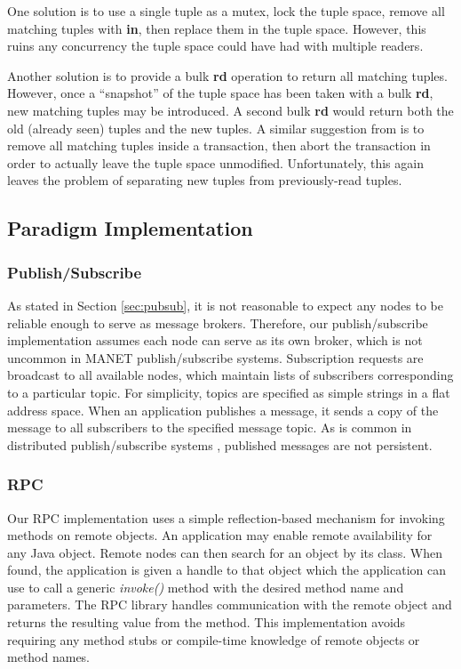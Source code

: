 One solution is to use a single tuple as a mutex, lock the tuple space, remove all matching tuples with \textbf{in}, then replace them in the tuple space. However, this ruins any concurrency the tuple space could have had with multiple readers.

Another solution is to provide a bulk \textbf{rd} operation to return all matching tuples. However, once a ``snapshot'' of the tuple space has been taken with a bulk \textbf{rd}, new matching tuples may be introduced. A second bulk \textbf{rd} would return both the old (already seen) tuples and the new tuples. A similar suggestion from \cite{edwards2001jini} is to remove all matching tuples inside a transaction, then abort the transaction in order to actually leave the tuple space unmodified. Unfortunately, this again leaves the problem of separating new tuples from previously-read tuples.

\subsection{Paradigm Implementation}

\subsubsection{Publish/Subscribe}

As stated in Section \ref{sec:pubsub}, it is not reasonable to expect any nodes to be reliable enough to serve as message brokers. Therefore, our publish/subscribe implementation assumes each node can serve as its own broker, which is not uncommon in MANET publish/subscribe systems\cite{psbrokers, psvsts}. Subscription requests are broadcast to all available nodes, which maintain lists of subscribers corresponding to a particular topic. For simplicity, topics are specified as simple strings in a flat address space. When an application publishes a message, it sends a copy of the message to all subscribers to the specified message topic. As is common in distributed publish/subscribe systems \cite{psfaces}, published messages are not persistent.

\subsubsection{RPC}

Our RPC implementation uses a simple reflection-based mechanism for invoking methods on remote objects. An application may enable remote availability for any Java object. Remote nodes can then search for an object by its class. When found, the application is given a handle to that object which the application can use to call a generic \textit{invoke()} method with the desired method name and parameters. The RPC library handles communication with the remote object and returns the resulting value from the method. This implementation avoids requiring any method stubs or compile-time knowledge of remote objects or method names.

